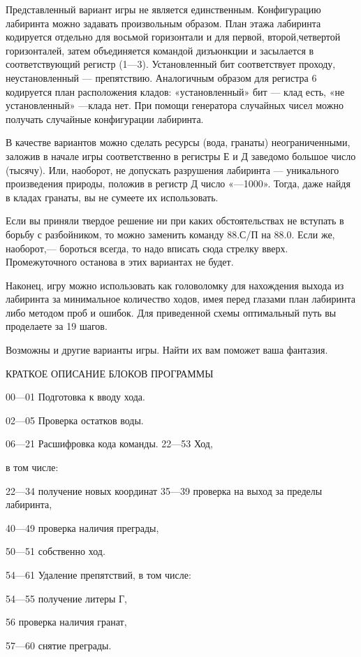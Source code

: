 \documentclass[11pt,a4paper,oneside]{article}
\begin{document}
Представленный вариант игры не является единственным. Конфигурацию лабиринта можно задавать произвольным образом. План этажа лабиринта кодируется отдельно для восьмой горизонтали и для первой, второй,четвертой горизонталей, затем объединяется командой дизъюнкции и засылается в соответствующий регистр (1—3). Установленный бит соответствует проходу, неустановленный — препятствию. Аналогичным образом для регистра 6 кодируется план расположения кладов: «установленный» бит — клад есть, «не установленный» —клада нет. При помощи генератора случайных чисел можно получать случайные конфигурации лабиринта.

В качестве вариантов можно сделать ресурсы (вода, гранаты) неограниченными, заложив в начале игры соответственно в регистры Е и Д заведомо большое число (тысячу). Или, наоборот, не допускать разрушения лабиринта — уникального произведения природы, положив в регистр Д число «—1000». Тогда, даже найдя в кладах гранаты, вы не сумеете их использовать.

Если вы приняли твердое решение ни при каких обстоятельствах не вступать в борьбу с разбойником, то можно заменить команду 88.С/П на 88.0. Если же, наоборот,— бороться всегда, то надо вписать сюда стрелку вверх. Промежуточного останова в этих вариантах не будет.

Наконец, игру можно использовать как головоломку для нахождения выхода из лабиринта за минимальное количество ходов, имея перед глазами план лабиринта либо методом проб и ошибок. Для приведенной схемы оптимальный путь вы проделаете за 19 шагов.

Возможны и другие варианты игры. Найти их вам поможет ваша фантазия.

КРАТКОЕ ОПИСАНИЕ БЛОКОВ ПРОГРАММЫ

00—01 Подготовка к вводу хода.

02—05 Проверка остатков воды.

06—21 Расшифровка кода команды. 22—53 Ход,

в том числе:

22—34 получение новых координат 35—39 проверка на выход за пределы лабиринта,

40—49 проверка наличия преграды,

50—51 собственно ход.

54—61 Удаление препятствий, в том числе:

54—55 получение литеры Г,

56 проверка наличия гранат,

57—60 снятие преграды.
\end{document}
